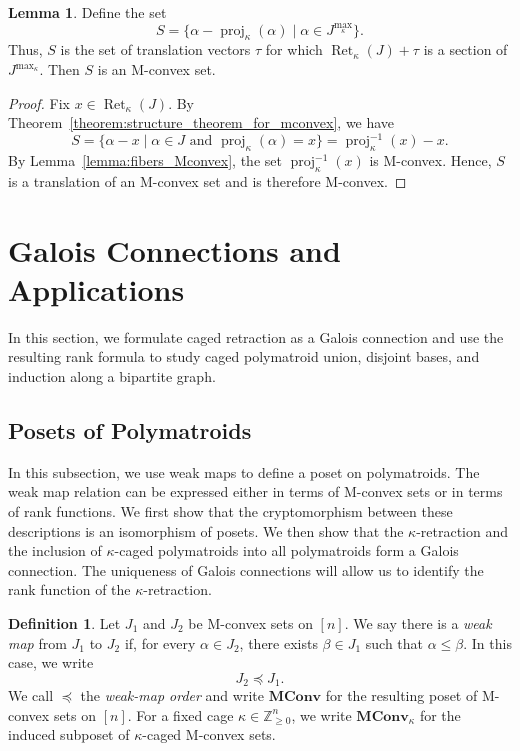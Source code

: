 \documentclass[11pt]{article}
\theoremstyle{definition}
\newtheorem{lemma}[theorem]{Lemma}
\newtheorem{definition}[theorem]{Definition}
\theoremstyle{remark}
\newcommand{\Zgeqn}{\mathbb{Z}_{\geq 0}^n}     %
\newcommand{\MConv}{\mathbf{MConv}}    %
\newcommand{\MConvK}{\mathbf{MConv}_\kappa}
\DeclareMathOperator{\proj}{proj}              %
\newcommand{\kproj}{\proj_{\kappa}}            %
\DeclareMathOperator{\Ret}{Ret}                %
\newcommand{\RetK}{\Ret_{\kappa}}              %
\newcommand{\Jmax}{J^{\max_{\kappa}}}
\begin{document}
\begin{lemma} \label{lemma:collection_of_sections_is_M-convex}
    Define the set
    \[
    S = \{\alpha - \kproj(\alpha) \mid \alpha \in \Jmax\}.
    \]
    Thus, $S$ is the set of translation vectors $\tau$ for which $\RetK(J) + \tau$ is a section of $\Jmax$. Then $S$ is an M-convex set.
\end{lemma}
\begin{proof}
    Fix $x \in \RetK(J)$. By Theorem~\ref{theorem:structure_theorem_for_mconvex}, we have
    \[
    S = \{\alpha - x \mid \alpha \in J \text{ and } \kproj(\alpha) = x\}
    = \kproj^{-1}(x) - x.
    \]
    By Lemma~\ref{lemma:fibers_Mconvex}, the set $\kproj^{-1}(x)$ is M-convex. Hence, $S$ is a translation of an M-convex set and is therefore M-convex.
\end{proof}



\section{Galois Connections and Applications}
\label{section:galois_connections_and_applications}
In this section, we formulate caged retraction as a Galois connection and use the resulting rank formula to study caged polymatroid union, disjoint bases, and induction along a bipartite graph.
\subsection{Posets of Polymatroids}

In this subsection, we use weak maps to define a poset on polymatroids. The weak map relation can be expressed either in terms of M-convex sets
or in terms of rank functions. We first show that the cryptomorphism between
these descriptions is an isomorphism of posets. We then show that the
$\kappa$-retraction and the inclusion of $\kappa$-caged polymatroids into all
polymatroids form a Galois connection. The uniqueness of Galois connections
will allow us to identify the rank function of the $\kappa$-retraction.

\begin{definition}\label{def:weak_map_order_mconvex}
    Let $J_1$ and $J_2$ be M-convex sets on $[n]$. We say there is a
    \emph{weak map} from $J_1$ to $J_2$ if, for every $\alpha\in J_2$,
    there exists $\beta\in J_1$ such that $\alpha\leq\beta$. In this case,
    we write
    \[
        J_2\preceq J_1.
    \]
    We call $\preceq$ the \emph{weak-map order} and write $\MConv$ for the
    resulting poset of M-convex sets on $[n]$. For a fixed cage
    $\kappa\in\Zgeqn$, we write $\MConvK$ for the induced subposet of
    $\kappa$-caged M-convex sets.
\end{definition}
\end{document}
